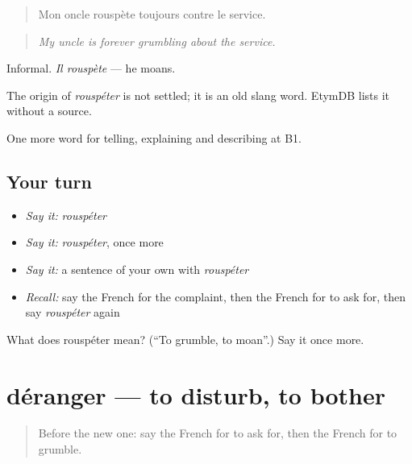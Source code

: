 \begin{quote}
Mon oncle rouspète toujours contre le service.
\end{quote}

\begin{quote}
\emph{My uncle is forever grumbling about the service.}
\end{quote}

Informal. \emph{Il rouspète} — he moans.

\begin{cousinweb}
The origin of \emph{rouspéter} is not settled; it is an old slang word. EtymDB lists it without a source.
\end{cousinweb}

\begin{grammarlens}[title={What you've built}]
One more word for telling, explaining and describing at B1.
\end{grammarlens}

\subsection*{Your turn}
\begin{itemize}
\raggedright
  \item \emph{Say it:} \emph{rouspéter}
  \item \emph{Say it:} \emph{rouspéter}, once more
  \item \emph{Say it:} a sentence of your own with \emph{rouspéter}
  \item \emph{Recall:} say the French for the complaint, then the French for to ask for, then say \emph{rouspéter} again
\end{itemize}

\begin{tcolorbox}[breakable,colback=teal!4,colframe=teal!35!black,title={Before you move on}]
What does rouspéter mean? (\textquotedblleft{}To grumble, to moan\textquotedblright{}.) Say it once more.
\end{tcolorbox}
\section[déranger]{déranger — to disturb, to bother}

\label{lesson:FR-C431-deranger}



\begin{quote}
Before the new one: say the French for to ask for, then the French for to grumble.
\end{quote}


